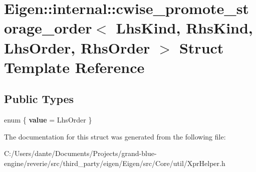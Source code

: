 \hypertarget{struct_eigen_1_1internal_1_1cwise__promote__storage__order}{}\section{Eigen\+::internal\+::cwise\+\_\+promote\+\_\+storage\+\_\+order$<$ Lhs\+Kind, Rhs\+Kind, Lhs\+Order, Rhs\+Order $>$ Struct Template Reference}
\label{struct_eigen_1_1internal_1_1cwise__promote__storage__order}
\subsection*{Public Types}
\begin{DoxyCompactItemize}
\item 
\mbox{\label{struct_eigen_1_1internal_1_1cwise__promote__storage__order_a106b56f4f21f99d70af598853320e19f}} 
enum \{ {\bfseries value} = Lhs\+Order
 \}
\end{DoxyCompactItemize}


The documentation for this struct was generated from the following file\+:\begin{DoxyCompactItemize}
\item 
C\+:/\+Users/dante/\+Documents/\+Projects/grand-\/blue-\/engine/reverie/src/third\+\_\+party/eigen/\+Eigen/src/\+Core/util/Xpr\+Helper.\+h\end{DoxyCompactItemize}
